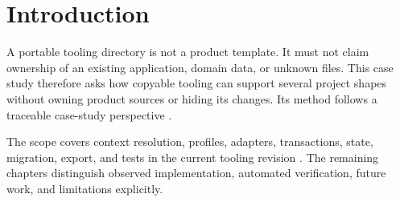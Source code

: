 \section{Introduction}
\label{chap:introduction}

A portable tooling directory is not a product template. It must not claim ownership of
an existing application, domain data, or unknown files. This case study therefore asks
how copyable tooling can support several project shapes without owning product sources or
hiding its changes. Its method follows a traceable case-study perspective
\parencite{runeson2009case-study}.

The scope covers context resolution, profiles, adapters, transactions, state, migration,
export, and tests in the current tooling revision \parencite{template-tooling-source}.
The remaining chapters distinguish observed implementation, automated verification,
future work, and limitations explicitly.
